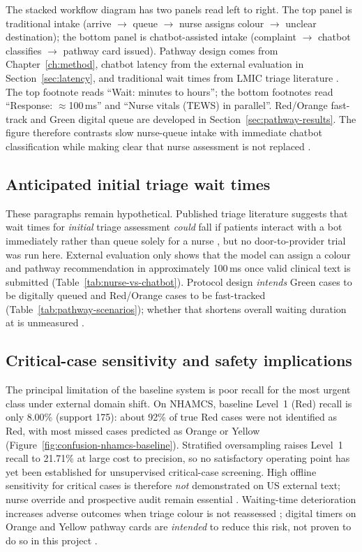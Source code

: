 The stacked workflow diagram has two panels read left to right. The top panel is traditional intake (arrive \(\rightarrow\) queue \(\rightarrow\) nurse assigns colour \(\rightarrow\) unclear destination); the bottom panel is chatbot-assisted intake (complaint \(\rightarrow\) chatbot classifies \(\rightarrow\) pathway card issued). Pathway design comes from Chapter~\ref{ch:method}, chatbot latency from the external evaluation in Section~\ref{sec:latency}, and traditional wait times from LMIC triage literature \citep{kathsats,Mitchell2023}. The top footnote reads ``Wait: minutes to hours''; the bottom footnotes read ``Response: \(\approx\)100\,ms'' and ``Nurse vitals (TEWS) in parallel''. Red/Orange fast-track and Green digital queue are developed in Section~\ref{sec:pathway-results}. The figure therefore contrasts slow nurse-queue intake with immediate chatbot classification while making clear that nurse assessment is not replaced \citep{satsmanual,stewart2023nlp}.

\subsection{Anticipated initial triage wait times}

These paragraphs remain hypothetical. Published triage literature suggests that wait times for \emph{initial} triage assessment \emph{could} fall if patients interact with a bot immediately rather than queue solely for a nurse \citep{Mitchell2023,Nurchis2025}, but no door-to-provider trial was run here. External evaluation only shows that the model can assign a colour and pathway recommendation in approximately 100\,ms once valid clinical text is submitted (Table~\ref{tab:nurse-vs-chatbot}). Protocol design \emph{intends} Green cases to be digitally queued and Red/Orange cases to be fast-tracked (Table~\ref{tab:pathway-scenarios}); whether that shortens overall waiting duration at \examplehospital{} is unmeasured \citep{Sundstrom2014,Yilmaz2021}.

\subsection{Critical-case sensitivity and safety implications}

The principal limitation of the baseline system is poor recall for the most urgent class under external domain shift. On NHAMCS, baseline Level~1 (Red) recall is only 8.00\% (support 175): about 92\% of true Red cases were not identified as Red, with most missed cases predicted as Orange or Yellow (Figure~\ref{fig:confusion-nhamcs-baseline}). Stratified oversampling raises Level~1 recall to 21.71\% at large cost to precision, so no satisfactory operating point has yet been established for unsupervised critical-case screening. High offline sensitivity for critical cases is therefore \emph{not} demonstrated on US external text; nurse override and prospective audit remain essential \citep{Berkowitz2019}. Waiting-time deterioration increases adverse outcomes when triage colour is not reassessed \citep{Nurchis2025}; digital timers on Orange and Yellow pathway cards are \emph{intended} to reduce this risk, not proven to do so in this project \citep{satsmanual}.

